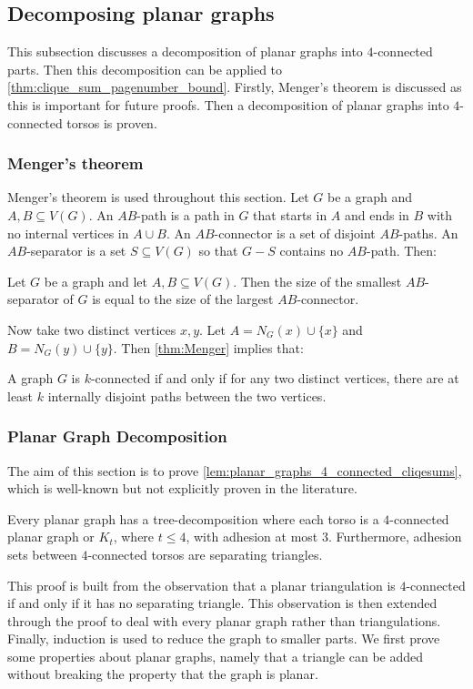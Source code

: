 \subsection{Decomposing planar graphs}
This subsection discusses a decomposition of planar graphs into $4$-connected parts. Then this decomposition can be applied to \cref{thm:clique_sum_pagenumber_bound}. Firstly, Menger's theorem is discussed as this is important for future proofs. Then a decomposition of planar graphs into $4$-connected torsos is proven.

\subsubsection{Menger's theorem}

Menger's theorem \cite{mengerZurAllgemeinenKurventheorie1927} is used throughout this section. 
Let \(G\) be a graph and \(A, B \subseteq V(G)\). An \(AB\)-path is a path in \(G\) that starts in \(A\) and ends in \(B\) with no internal vertices in \(A \cup B\). An \(AB\)-connector is a set of disjoint \(AB\)-paths. An \(AB\)-separator is a set \(S \subseteq V(G)\) so that \(G - S\) contains no \(AB\)-path. Then:
\begin{theorem}\label{thm:Menger}
	Let $G$ be a graph and let $A, B \subseteq V(G)$. Then the size of the smallest \(AB\)-separator of \(G\) is equal to the size of the largest \(AB\)-connector.
\end{theorem}
Now take two distinct vertices \(x, y\). Let \(A = N_G(x) \cup \{x\} \) and \(B = N_G(y) \cup \{y\} \). Then \cref{thm:Menger} implies that:
\begin{theorem}\label{thm:Menger_Vertex}
	A graph \(G\) is \(k\)-connected if and only if for any two distinct vertices, there are at least \(k\) internally disjoint paths between the two vertices.
\end{theorem}

\subsubsection{Planar Graph Decomposition}
The aim of this section is to prove \cref{lem:planar_graphs_4_connected_cliqesums}, which is well-known but not explicitly proven in the literature. 
\begin{proposition}\label{lem:planar_graphs_4_connected_cliqesums}
	Every planar graph has a tree-decomposition where each torso is a \(4\)-connected planar graph or $K_{t}$, where $t \leq 4$, with adhesion at most \(3\). Furthermore, adhesion sets between $4$-connected torsos are separating triangles.
\end{proposition}
This proof is built from the observation that a planar triangulation is $4$-connected if and only if it has no separating triangle. This observation is then extended through the proof to deal with every planar graph rather than triangulations. Finally, induction is used to reduce the graph to smaller parts. We first prove some properties about planar graphs, namely that a triangle can be added without breaking the property that the graph is planar.

